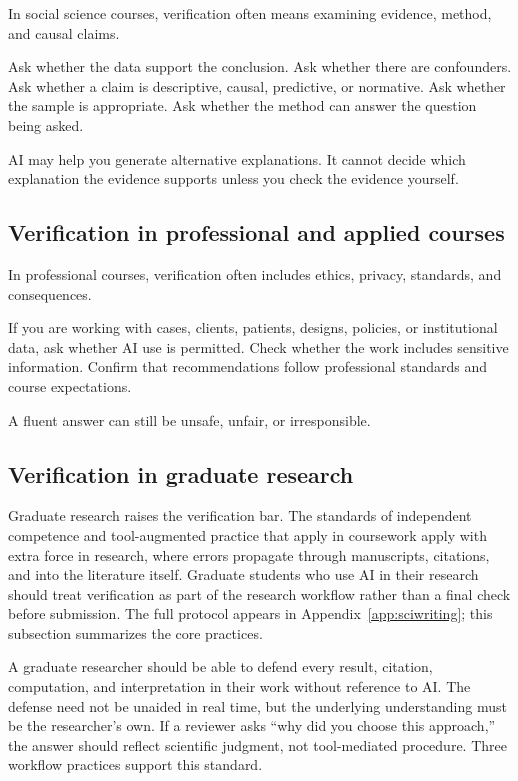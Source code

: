 \documentclass{SIAMbook2023}
\begin{document}
In social science courses, verification often means examining evidence, method, and causal claims.

Ask whether the data support the conclusion. Ask whether there are confounders. Ask whether a claim is descriptive, causal, predictive, or normative. Ask whether the sample is appropriate. Ask whether the method can answer the question being asked.

AI may help you generate alternative explanations. It cannot decide which explanation the evidence supports unless you check the evidence yourself.

\subsection{Verification in professional and applied courses}
\label{subsec:professional-verification}%

In professional courses, verification often includes ethics, privacy, standards, and consequences.

If you are working with cases, clients, patients, designs, policies, or institutional data, ask whether AI use is permitted. Check whether the work includes sensitive information. Confirm that recommendations follow professional standards and course expectations.

A fluent answer can still be unsafe, unfair, or irresponsible.

\subsection{Verification in graduate research}
\label{subsec:graduate-research-verification}%

Graduate research raises the verification bar. The standards of independent competence and tool-augmented practice that apply in coursework apply with extra force in research, where errors propagate through manuscripts, citations, and into the literature itself. Graduate students who use AI in their research should treat verification as part of the research workflow rather than a final check before submission. The full protocol appears in Appendix~\ref{app:sciwriting}; this subsection summarizes the core practices.

A graduate researcher should be able to defend every result, citation, computation, and interpretation in their work without reference to AI. The defense need not be unaided in real time, but the underlying understanding must be the researcher's own. If a reviewer asks ``why did you choose this approach,'' the answer should reflect scientific judgment, not tool-mediated procedure. Three workflow practices support this standard.
\end{document}
